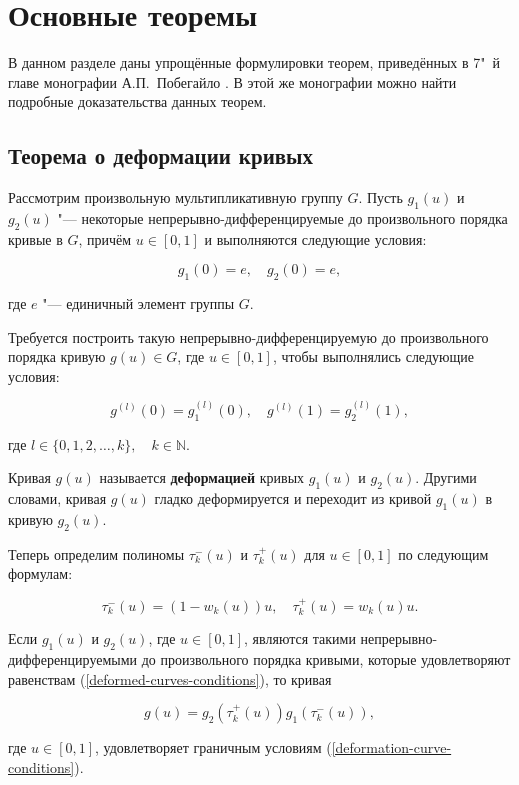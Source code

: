 \section{Основные теоремы}

В данном разделе даны упрощённые формулировки теорем, приведённых в 7"~й главе монографии А.П.~Побегайло
\cite{pobegaylo}. В этой же монографии можно найти подробные доказательства данных теорем.

\subsection*{Теорема о деформации кривых}

Рассмотрим произвольную мультипликативную группу $G$. Пусть $g_1(u)$ и $g_2(u)$ "--- некоторые
непрерывно-дифференцируемые до произвольного порядка кривые в $G$, причём $u \in [0,1]$ и выполняются следующие условия:

\begin{equation}
g_1(0)=e, \quad g_2(0)=e,
\label{deformed-curves-conditions}
\end{equation}

\noindent где $e$ "--- единичный элемент группы $G$.

Требуется построить такую непрерывно-дифференцируемую до произвольного порядка кривую $g(u)\in G$, где $u \in [0,1]$,
чтобы выполнялись следующие условия:

\begin{equation}
g^{(l)}(0)=g_1^{(l)}(0), \quad g^{(l)}(1)=g_2^{(l)}(1),
\label{deformation-curve-conditions}
\end{equation}

\noindent где $l \in \{0,1,2,\dots,k\},\quad k\in\mathbb{N}$.

\begin{definition}
Кривая $g(u)$ называется \textbf{деформацией} кривых $g_1(u)$ и $g_2(u)$. Другими словами, кривая $g(u)$ гладко
деформируется и переходит из кривой $g_1(u)$ в кривую $g_2(u)$.
\end{definition}

Теперь определим полиномы $\tau_k^-(u)$ и $\tau_k^+(u)$ для $u \in [0,1]$ по следующим формулам:

$$
\tau_k^-(u)=(1-w_k(u))u, \quad \tau_k^+(u)=w_k(u)u.
$$

\begin{theorem}
Если $g_1(u)$ и $g_2(u)$, где $u \in [0,1]$, являются такими непрерывно-дифференцируемыми до произвольного порядка
кривыми, которые удовлетворяют равенствам (\ref{deformed-curves-conditions}), то кривая

$$
g(u)=g_2(\tau_k^+(u))g_1(\tau_k^-(u)),
$$

\noindent где $u \in [0,1]$, удовлетворяет граничным условиям (\ref{deformation-curve-conditions}).
\end{theorem}

